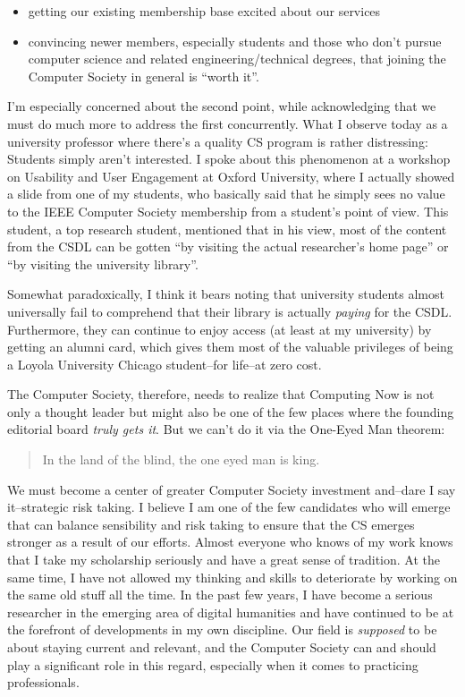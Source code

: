 \documentclass[11pt,english]{luclet}
\begin{document}
\begin{itemize}
\item
  getting our existing membership base excited about our services
\item
  convincing newer members, especially students and those who don't
  pursue computer science and related engineering/technical degrees,
  that joining the Computer Society in general is ``worth it''.
\end{itemize}
I'm especially concerned about the second point, while acknowledging
that we must do much more to address the first concurrently. What I
observe today as a university professor where there's a quality CS
program is rather distressing: Students simply aren't interested. I
spoke about this phenomenon at a workshop on Usability and User
Engagement at Oxford University, where I actually showed a slide from
one of my students, who basically said that he simply sees no value to
the IEEE Computer Society membership from a student's point of view.
This student, a top research student, mentioned that in his view, most
of the content from the CSDL can be gotten ``by visiting the actual
researcher's home page'' or ``by visiting the university library''.

Somewhat paradoxically, I think it bears noting that university students
almost universally fail to comprehend that their library is actually
\emph{paying} for the CSDL. Furthermore, they can continue to enjoy
access (at least at my university) by getting an alumni card, which
gives them most of the valuable privileges of being a Loyola University
Chicago student--for life--at zero cost.

The Computer Society, therefore, needs to realize that Computing Now is
not only a thought leader but might also be one of the few places where
the founding editorial board \emph{truly gets it}. But we can't do it
via the One-Eyed Man theorem:

\begin{quote}
In the land of the blind, the one eyed man is king.

\end{quote}
We must become a center of greater Computer Society investment and--dare
I say it--strategic risk taking. I believe I am one of the few
candidates who will emerge that can balance sensibility and risk taking
to ensure that the CS emerges stronger as a result of our efforts.
Almost everyone who knows of my work knows that I take my scholarship
seriously and have a great sense of tradition. At the same time, I have
not allowed my thinking and skills to deteriorate by working on the same
old stuff all the time. In the past few years, I have become a serious
researcher in the emerging area of digital humanities and have continued
to be at the forefront of developments in my own discipline. Our field
is \emph{supposed} to be about staying current and relevant, and the
Computer Society can and should play a significant role in this regard,
especially when it comes to practicing professionals.
\end{document}
